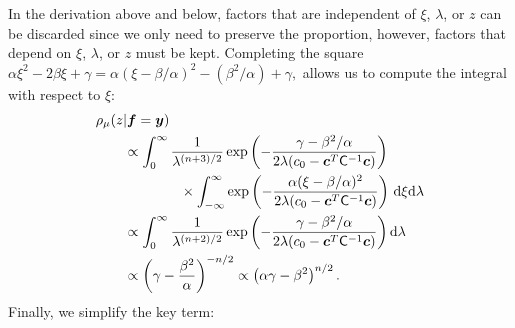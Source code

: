 \documentclass[smallextended]{svjour3}       %
\newcommand{\bm}[1]{\boldsymbol{#1}}
\newcommand{\D}[1]{\text{d}{#1}}
\newcommand{\vc}{\bm{c}}
\newcommand{\vf}{\bm{f}}
\newcommand{\vy}{\bm{y}}
\newcommand{\mC}{\mathsf{C}}
\begin{document}
In the derivation above and below, factors that are independent of $\xi$, $\lambda$, or $z$ can be discarded since we only need to preserve the proportion, however, factors that depend on $\xi$, $\lambda$, or $z$ must be kept.  
Completing the square $
\alpha \xi^2 -2 \beta \xi + \gamma 
= \alpha (\xi -\beta/\alpha)^2  - (\beta^2/\alpha) + \gamma,
$
allows us to compute the integral with respect to $\xi$:
\begin{align*}
\MoveEqLeft{\rho_{\mu}(z | \vf = \vy)} \\
& \propto \displaystyle \int_{0}^\infty  \frac{1}{\lambda^{(n+3)/2}}  \exp\left( -\frac{  \gamma - \beta^2/\alpha}{2\lambda(c_0  -\vc ^T \mC^{-1} \vc)} \right)  \\
& \qquad \qquad \times \int_{-\infty}^\infty  \exp\left( -\frac{\alpha (\xi -\beta/\alpha)^2}{2\lambda(c_0  -\vc ^T \mC^{-1} \vc)} \right) \, \D \xi \D \lambda \\
& \propto \displaystyle \int_{0}^\infty  \frac{1}{\lambda^{(n+2)/2}}  \exp\left( -\frac{  \gamma - \beta^2/\alpha}{2\lambda(c_0  -\vc ^T \mC^{-1} \vc)} \right) \D \lambda \\
& \propto \left(\gamma - \frac{\beta^2}{\alpha}\right)^{-n/2} \propto \left(\alpha \gamma - \beta^2\right)^{n/2}.
\end{align*}
Finally, we simplify the key term:
\end{document}
